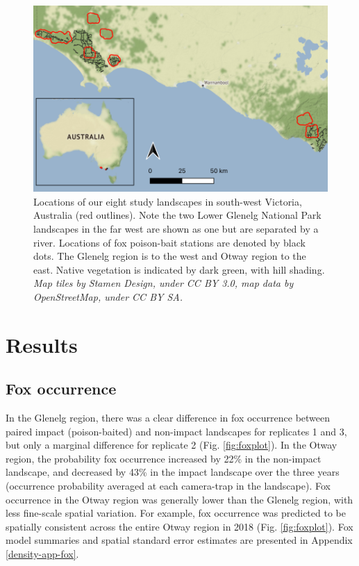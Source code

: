\documentclass[11pt,a4paper,titlepage,twoside,openright]{style/unimelbthesis}
\begin{document}
\begin{mainmatter}
\newpage

\(~\)

\(~\)

\(~\)
\begin{figure}

{\centering \includegraphics[width=1\linewidth]{figure/map_density} 

}

\caption{Locations of our eight study landscapes in south-west Victoria, Australia (red outlines). Note the two Lower Glenelg National Park landscapes in the far west are shown as one but are separated by a river. Locations of fox poison-bait stations are denoted by black dots. The Glenelg region is to the west and Otway region to the east. Native vegetation is indicated by dark green, with hill shading. \textit{Map tiles by Stamen Design, under CC BY 3.0, map data by OpenStreetMap, under CC BY SA.}}\label{fig:density-map}
\end{figure}
\newpage

\hypertarget{results-2}{%
\section{Results}\label{results-2}}

\hypertarget{fox-occurrence}{%
\subsection{Fox occurrence}\label{fox-occurrence}}

In the Glenelg region, there was a clear difference in fox occurrence between paired impact (poison-baited) and non-impact landscapes for replicates 1 and 3, but only a marginal difference for replicate 2 (Fig. \ref{fig:foxplot}). In the Otway region, the probability fox occurrence increased by 22\% in the non-impact landscape, and decreased by 43\% in the impact landscape over the three years (occurrence probability averaged at each camera-trap in the landscape). Fox occurrence in the Otway region was generally lower than the Glenelg region, with less fine-scale spatial variation. For example, fox occurrence was predicted to be spatially consistent across the entire Otway region in 2018 (Fig. \ref{fig:foxplot}). Fox model summaries and spatial standard error estimates are presented in Appendix \ref{density-app-fox}.


\end{mainmatter}
\end{document}
